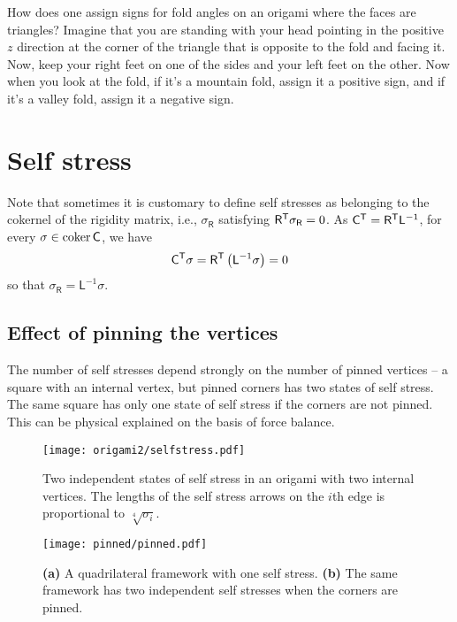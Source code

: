 How does one assign signs for fold angles on an origami where the faces are triangles?
Imagine that you are standing with your head pointing in the positive $z$ direction at the corner of the triangle that is opposite to the fold and facing it.
Now, keep your right feet on one of the sides and your left feet on the other.
Now when you look at the fold, if it's a mountain fold, assign it a positive sign, and if it's a valley fold, assign it a negative sign.

\section{Self stress}

Note that sometimes it is customary to define self stresses as belonging to the cokernel of the rigidity matrix, i.e., $\sigma_{\mathsf{R}}$ satisfying $\mathsf{R}^\mathsf{T}\sigma_{\mathsf{R}} = 0$.
As $\mathsf{C}^\mathsf{T} = \mathsf{R}^\mathsf{T}\mathsf{L}^{-1}$, for every $\sigma \in \operatorname{coker}\mathsf{C}$, we have
%
\begin{equation}
  \mathsf{C}^\mathsf{T}\sigma = \mathsf{R}^\mathsf{T}\left(\mathsf{L}^{-1}\mathsf{\sigma}\right) = 0
\end{equation}
%
so that $\sigma_{\mathsf{R}} = \mathsf{L}^{-1}\sigma$.

\subsection{Effect of pinning the vertices}

The number of self stresses depend strongly on the number of pinned vertices -- a square with an internal vertex, but pinned corners has two states of self stress.  The same square has only one state of self stress if the corners are not pinned.
This can be physical explained on the basis of force balance.

\begin{figure}
  \begin{center}
    \texttt{[image: origami2/selfstress.pdf]}
  \end{center}
  \caption{
    Two independent states of self stress in an origami with two internal vertices.
    The lengths of the self stress arrows on the $i$th edge is proportional to $\sqrt[4]{\sigma_{i}}$.
  }
  \label{fig:origami2_selfstress}
\end{figure}
%
\begin{figure}
  \begin{center}
    \texttt{[image: pinned/pinned.pdf]}
  \end{center}
  \caption{
    \textsf{\textbf{(a)}} A quadrilateral framework with one self stress.
    \textsf{\textbf{(b)}} The same framework has two independent self stresses when the corners are pinned.
  }
  \label{fig:quad_pinned}
\end{figure}
